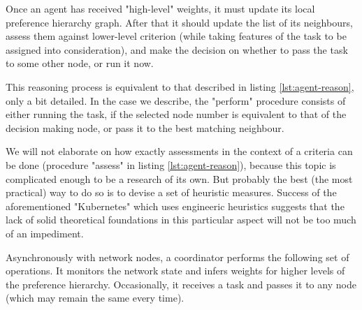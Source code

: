 Once an agent has received "high-level" weights, it must update its local preference hierarchy graph.
After that it should update the list of its neighbours, assess them against lower-level criterion (while taking features of the task to be assigned into consideration), and make the decision on whether to pass the task to some other node, or run it now.

This reasoning process is equivalent to that described in listing \ref{lst:agent-reason}, only a bit detailed.
In the case we describe, the "perform" procedure consists of either running the task, if the selected node number is equivalent to that of the decision making node, or pass it to the best matching neighbour.

We will not elaborate on how exactly assessments in the context of a criteria can be done (procedure "assess" in listing \ref{lst:agent-reason}), because this topic is complicated enough to be a research of its own.
But probably the best (the most practical) way to do so is to devise a set of heuristic measures.
Success of the aforementioned "Kubernetes" which uses engineeric heuristics suggests that the lack of solid theoretical foundations in this particular aspect will not be too much of an impediment.

Asynchronously with network nodes, a coordinator performs the following set of operations. It monitors the network state and infers weights for higher levels of the preference hierarchy. Occasionally, it receives a task and passes it to any node (which may remain the same every time).
